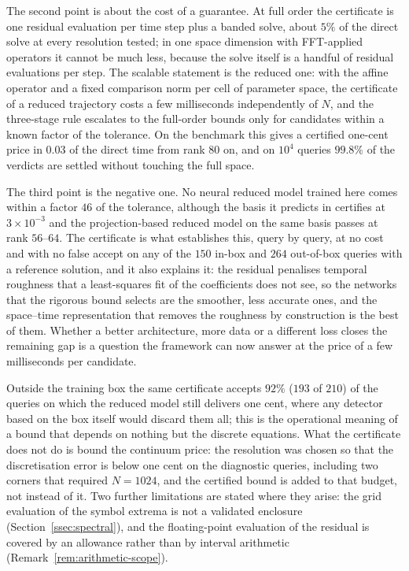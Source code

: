 \documentclass[11pt]{amsart}
\theoremstyle{remark}
\begin{document}
The second point is about the cost of a guarantee.  At full order the certificate is one residual
evaluation per time step plus a banded solve, about $5\%$ of the direct solve at every resolution
tested; in one space dimension with FFT-applied operators it cannot be much less, because the
solve itself is a handful of residual evaluations per step.  The scalable statement is the reduced
one: with the affine operator and a fixed comparison norm per cell of parameter space, the
certificate of a reduced trajectory costs a few milliseconds independently of $N$, and the
three-stage rule escalates to the full-order bounds only for candidates within a known factor of
the tolerance.  On the benchmark this gives a certified one-cent price in $0.03$ of the direct time
from rank $80$ on, and on $10^4$ queries $99.8\%$ of the verdicts are settled without touching the
full space.

The third point is the negative one.  No neural reduced model trained here comes within a factor
$46$ of the tolerance, although the basis it predicts in certifies at $3\times10^{-3}$ and the
projection-based reduced model on the same basis passes at rank $56$--$64$.  The certificate is
what establishes this, query by query, at no cost and with no false accept on any of the $150$
in-box and $264$ out-of-box queries with a reference solution, and it also explains it: the residual penalises temporal roughness that
a least-squares fit of the coefficients does not see, so the networks that the rigorous bound
selects are the smoother, less accurate ones, and the space--time representation that removes the
roughness by construction is the best of them.  Whether a better architecture, more data or a
different loss closes the remaining gap is a question the framework can now answer at the price of
a few milliseconds per candidate.

Outside the training box the same certificate accepts $92\%$ ($193$ of $210$) of the queries on which the reduced
model still delivers one cent, where any detector based on the box itself would discard them all;
this is the operational meaning of a bound that depends on nothing but the discrete equations.
What the certificate does not do is bound the continuum price: the resolution was chosen so that
the discretisation error is below one cent on the diagnostic queries, including two corners that
required $N=1024$, and the certified bound is added to that budget, not instead of it.  Two further
limitations are stated where they arise: the grid evaluation of the symbol extrema is not a
validated enclosure (Section~\ref{ssec:spectral}), and the floating-point evaluation of the
residual is covered by an allowance rather than by interval arithmetic
(Remark~\ref{rem:arithmetic-scope}).
\end{document}

